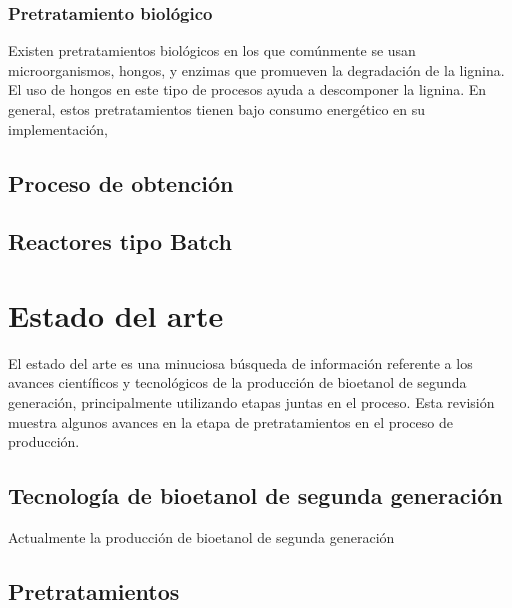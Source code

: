\documentclass[12pt]{article}
\begin{document}
\begin{appendix}
\subsubsection{Pretratamiento biológico }

Existen pretratamientos biológicos en los que comúnmente se usan microorganismos, hongos, y enzimas que promueven la degradación de la lignina. El uso de hongos en este tipo de procesos ayuda a descomponer la lignina. En general, estos pretratamientos tienen bajo consumo energético en su implementación, %

\subsection{Proceso de obtención }


\subsection{Reactores tipo Batch }





	
	
		\section{Estado del arte}

	\label{Estado del arte}
El estado del arte es una minuciosa búsqueda de información referente a los avances científicos y tecnológicos de la producción de bioetanol de segunda generación, principalmente utilizando etapas juntas en el proceso. Esta revisión muestra algunos avances en la etapa de pretratamientos en el proceso de producción.

\subsection{Tecnología de bioetanol de segunda generación}
Actualmente la producción de bioetanol de segunda generación
\subsection{Pretratamientos }


\end{appendix}
\end{document}
